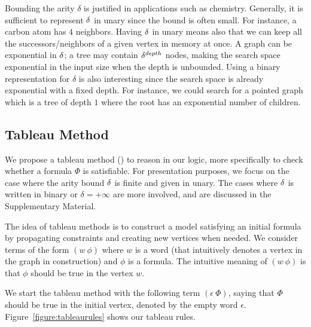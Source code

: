 Bounding the arity $\delta$ is justified in applications such as chemistry.
Generally, it is sufficient to represent $\delta$ in unary since the bound is often small. For instance, a carbon atom has $4$ neighbors. Having $\delta$ in unary means also that we can keep all the successors/neighbors of a given vertex in memory at once.
A graph can be exponential in $\delta$; a tree may contain $\delta^{depth}$ nodes, making the search space exponential in the input size when the depth is unbounded. Using a binary representation for $\delta$ is also interesting since the search space is already exponential with a fixed depth. For instance, we could search for a pointed graph which is a tree of depth $1$ where the root has an exponential number of children.

\subsection{Tableau Method}



We propose a tableau method (\cite{DBLP:books/el/RV01/Hahnle01,DBLP:books/daglib/0032750}) to reason in our logic, more specifically to check whether a formula $\Phi$ is satisfiable. For presentation purposes, we focus on the case where the arity bound $\delta$ is finite and given in unary. The cases where $\delta$ is written in binary or $\delta = +\infty$ are more involved, and are discussed in the Supplementary Material.

The idea of tableau methods is to construct a model satisfying an initial formula by propagating constraints and creating new vertices when needed.
We consider terms of the form $(w~\phi)$ where $w$ is a word (that intuitively denotes a vertex in the graph in construction) and $\phi$ is a formula. The intuitive meaning of $(w~\phi)$ is that $\phi$ should be true in the vertex $w$.

We start the tableau method with the following term $(\epsilon ~ \Phi)$, saying that $\Phi$ should be true in the initial vertex, denoted by the empty word $\epsilon$.
Figure~\ref{figure:tableaurules} shows our tableau rules. %

